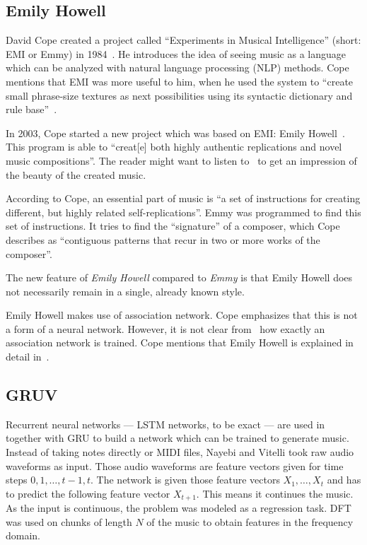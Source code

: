 \documentclass[technote,a4paper,leqno]{IEEEtran}
\begin{document}
\subsection{Emily Howell}
David Cope created a project called \enquote{Experiments in Musical
Intelligence} (short: EMI or Emmy) in 1984~\cite{Cope1987}. He introduces the idea of
seeing music as a language which can be analyzed with natural language
processing (NLP) methods. Cope mentions that EMI was more useful to him, when
he used the system to \enquote{create small phrase-size textures as next
possibilities using its syntactic dictionary and rule base}~\cite{Cope1987}.

In 2003, Cope started a new project which was based on EMI: Emily
Howell~\cite{cope2013well}. This program is able to \enquote{creat[e] both
highly authentic replications and novel music compositions}. The reader might
want to listen to~\cite{Cope2012} to get an impression of the beauty of the
created music.

According to Cope, an essential part of music is \enquote{a set of instructions
for creating different, but highly related self-replications}. Emmy was
programmed to find this set of instructions. It tries to find the
\enquote{signature} of a composer, which Cope describes as \enquote{contiguous
patterns that recur in two or more works of the composer}.

The new feature of \textit{Emily Howell} compared to \textit{Emmy} is that
Emily Howell does not necessarily remain in a single, already known style.

Emily Howell makes use of association network. Cope emphasizes that this is not
a form of a neural network. However, it is not clear from~\cite{cope2013well}
how exactly an association network is trained. Cope mentions that Emily
Howell is explained in detail in~\cite{cope2005computer}.

\subsection{GRUV}

Recurrent neural networks --- \gls{LSTM} networks, to be exact --- are used
in~\cite{nayebigruv} together with \gls{GRU} to build a network which can be
trained to generate music. Instead of taking notes directly or MIDI files,
Nayebi and Vitelli took raw audio waveforms as input. Those audio waveforms are
feature vectors given for time steps $0, 1, \dots, t-1, t$. The network is
given those feature vectors $X_1, \dots, X_t$ and has to predict the following
feature vector $X_{t+1}$. This means it continues the music. As the input is
continuous, the problem was modeled as a regression task. \Gls{DFT} was used on
chunks of length $N$ of the music to obtain features in the frequency domain.
\end{document}
